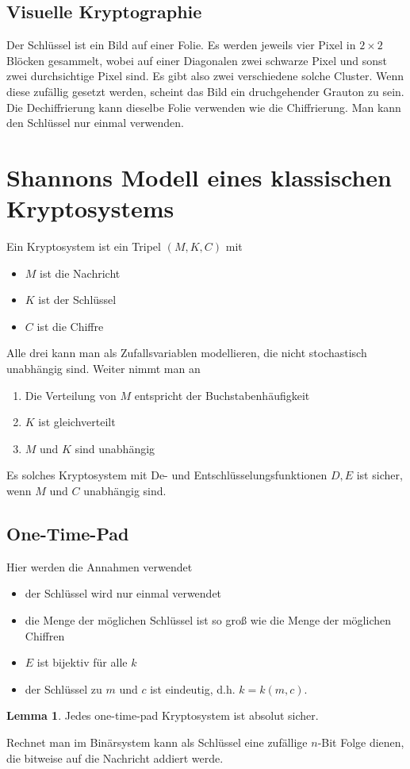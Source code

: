 \documentclass[a4paper, 12pt]{article}
\theoremstyle{plain}
\theoremstyle{definition}
\theoremstyle{lemma}
\newtheorem{lemma}[theorem]{Lemma}
\theoremstyle{remark}
\theoremstyle{corollary}
\theoremstyle{example}
\begin{document}
	\subsection{Visuelle Kryptographie}
	Der Schlüssel ist ein Bild auf einer Folie. Es werden jeweils vier Pixel in $2\times 2$ Blöcken gesammelt, wobei auf einer Diagonalen zwei schwarze Pixel und sonst zwei durchsichtige Pixel sind. Es gibt also zwei verschiedene solche Cluster. Wenn diese zufällig gesetzt werden, scheint das Bild ein druchgehender Grauton zu sein. Die Dechiffrierung kann dieselbe Folie verwenden wie die Chiffrierung. Man kann den Schlüssel nur einmal verwenden.
	\section{Shannons Modell eines klassischen Kryptosystems}
	Ein Kryptosystem ist ein Tripel $(M,K,C)$ mit \begin{itemize}
		\item $M$ ist die Nachricht
		\item $K$ ist der Schlüssel
		\item $C$ ist die Chiffre
	\end{itemize}
	Alle drei kann man als Zufallsvariablen modellieren, die nicht stochastisch unabhängig sind. Weiter nimmt man an 
	\begin{enumerate}
		\item Die Verteilung von $M$ entspricht der Buchstabenhäufigkeit
		\item $K$ ist gleichverteilt
		\item $M$ und $K$ sind unabhängig
	\end{enumerate}
	Es solches Kryptosystem mit De- und Entschlüsselungsfunktionen $D,E$ ist sicher, wenn $M$ und $C$ unabhängig sind.
	\subsection{One-Time-Pad}
	Hier werden die Annahmen verwendet \begin{itemize}
		\item der Schlüssel wird nur einmal verwendet
		\item die Menge der möglichen Schlüssel ist so groß wie die Menge der möglichen Chiffren
		\item $E$ ist bijektiv für alle $k$
		\item der Schlüssel zu $m$ und $c$ ist eindeutig, d.h. $k = k(m,c)$.
	\end{itemize}
	\begin{lemma}
		Jedes one-time-pad Kryptosystem ist absolut sicher.
	\end{lemma}
	Rechnet man im Binärsystem kann als Schlüssel eine zufällige $n$-Bit Folge dienen, die bitweise auf die Nachricht addiert werde. 
\end{document}
